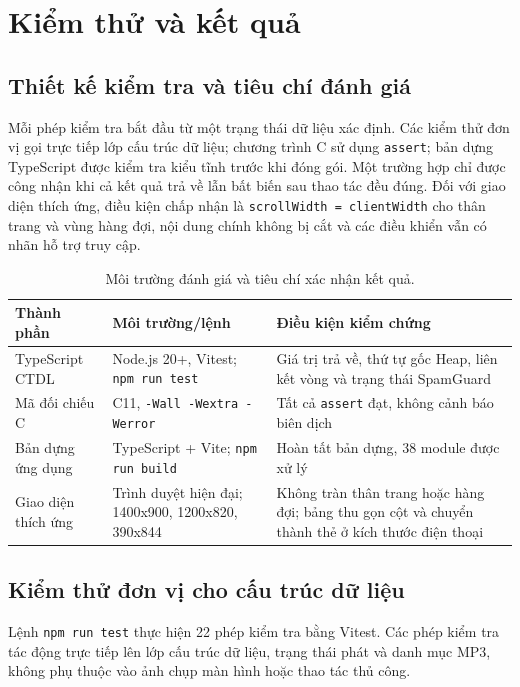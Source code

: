 \documentclass[12pt,a4paper,twoside,openright]{report}
\newcommand{\code}[1]{\texttt{#1}}
\begin{document}
\chapter{Kiểm thử và kết quả}
\section{Thiết kế kiểm tra và tiêu chí đánh giá}
Mỗi phép kiểm tra bắt đầu từ một trạng thái dữ liệu xác định. Các kiểm thử đơn vị gọi trực
tiếp lớp cấu trúc dữ liệu; chương trình C sử dụng \code{assert}; bản dựng TypeScript được
kiểm tra kiểu tĩnh trước khi đóng gói. Một trường hợp chỉ được công nhận khi cả kết quả trả
về lẫn bất biến sau thao tác đều đúng. Đối với giao diện thích ứng, điều kiện chấp nhận là
\code{scrollWidth = clientWidth} cho thân trang và vùng hàng đợi, nội dung chính không bị
cắt và các điều khiển vẫn có nhãn hỗ trợ truy cập.

\begin{table}[h]\centering\small
\begin{tabularx}{\textwidth}{@{}p{3cm}p{4.2cm}X@{}}
\toprule
\textbf{Thành phần} & \textbf{Môi trường/lệnh} & \textbf{Điều kiện kiểm chứng}\\
\midrule
TypeScript CTDL & Node.js 20+, Vitest; \code{npm run test} & Giá trị trả về, thứ tự gốc Heap,
liên kết vòng và trạng thái SpamGuard\\
Mã đối chiếu C & C11, \code{-Wall -Wextra -Werror} & Tất cả \code{assert} đạt, không cảnh báo biên dịch\\
Bản dựng ứng dụng & TypeScript + Vite; \code{npm run build} & Hoàn tất bản dựng, 38 module được xử lý\\
Giao diện thích ứng & Trình duyệt hiện đại; 1400x900, 1200x820, 390x844 & Không tràn thân
trang hoặc hàng đợi; bảng thu gọn cột và chuyển thành thẻ ở kích thước điện thoại\\
\bottomrule
\end{tabularx}
\caption{Môi trường đánh giá và tiêu chí xác nhận kết quả.}
\label{tab:experiment}
\end{table}

\section{Kiểm thử đơn vị cho cấu trúc dữ liệu}
Lệnh \code{npm run test} thực hiện 22 phép kiểm tra bằng Vitest. Các phép kiểm tra tác động
trực tiếp lên lớp cấu trúc dữ liệu, trạng thái phát và danh mục MP3, không phụ thuộc vào ảnh
chụp màn hình hoặc thao tác thủ công.
\end{document}
